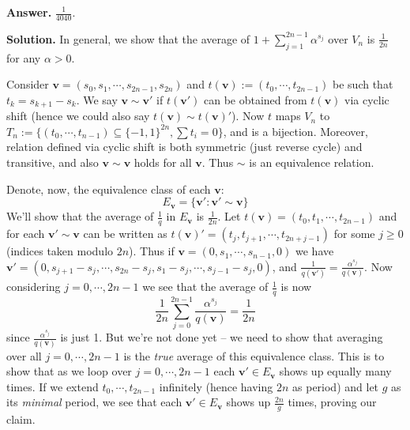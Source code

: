 \documentclass[11pt,a4paper]{article}
\newcommand{\<}{\langle}
\renewcommand{\>}{\rangle}
\begin{document}
\begin{enumerate}
	\textbf{Answer.} $\frac{1}{4040}$. 
	
	\textbf{Solution.} In general, we show that the average of $1+\sum_{j=1}^{2n-1}\alpha^{s_j}$ over $V_n$ is $\frac{1}{2n}$ for any $\alpha > 0$. 
	
	Consider $\mathbf{v}=(s_0,s_1,\cdots,s_{2n-1},s_{2n})$ and 
	$t(\mathbf{v}) := (t_0, \cdots, t_{2n-1})$ be such that $t_k = s_{k+1}-s_k$. 
	We say $\mathbf{v}\sim\mathbf{v'}$ if $t(\mathbf{v}')$ can be obtained from $t(\mathbf{v})$ via cyclic shift (hence we could also say $t(\mathbf{v})\sim t(\mathbf{v})'$). 
	Now $t$ maps $V_n$ to $T_n:=\{(t_0, \cdots, t_{n-1})\subseteq \{-1, 1\}^{2n}, \sum t_i=0\}$, 
	and is a bijection. 
	Moreover, relation defined via cyclic shift is both symmetric (just reverse cycle) and transitive, and also $\mathbf{v}\sim\mathbf{v}$ holds for all $\mathbf{v}$. 
	Thus $\sim$ is an equivalence relation. 
	
	Denote, now, the equivalence class of each $\mathbf{v}$: 
	\[
	E_{\mathbf{v}} = \{\mathbf{v}': \mathbf{v'}\sim \mathbf{v}\}
	\]
	We'll show that the average of $\frac{1}{q}$ in $E_{\mathbf{v}}$ is $\frac{1}{2n}$. 
	Let $t(\mathbf{v})=(t_0,t_1,\cdots,t_{2n-1})$ and for each $\mathbf{v}'\sim\mathbf{v}$ can be written as 
	$t(\mathbf{v})'=(t_j,t_{j+1},\cdots,t_{2n+j-1})$ for some $j\ge 0$ (indices taken modulo $2n$). 
	Thus if $\mathbf{v}=(0, s_1, \cdots, s_{n-1}, 0)$ we have 
	$\mathbf{v}'=(0, s_{j+1}-s_j, \cdots, s_{2n}-s_j, s_1-s_j, \cdots, s_{j-1}-s_j, 0)$, 
	and $\frac{1}{q(\mathbf{v}')}=\frac{\alpha^{s_j}}{q(\mathbf{v})}$. 
	Now considering $j=0, \cdots, 2n-1$ we see that the average of $\frac{1}{q}$ is now 
	\[
	\frac{1}{2n}\sum_{j=0}^{2n-1}\frac{\alpha^{s_j}}{q(\mathbf{v})} = \frac{1}{2n}
	\]
	since $\frac{\alpha^{s_j}}{q(\mathbf{v})}$ is just 1. 
	But we're not done yet -- we need to show that averaging over all $j=0, \cdots, 2n-1$ is the \emph{true} average of this equivalence class. 
	This is to show that as we loop over $j=0, \cdots, 2n-1$ each $\mathbf{v}'\in E_{\mathbf{v}}$ shows up equally many times. 
	If we extend $t_0, \cdots, t_{2n-1}$ infinitely (hence having $2n$ as period) and let $g$ as its \emph{minimal} period, we see that each $\mathbf{v}'\in E_{\mathbf{v}}$ shows up $\frac{2n}{g}$ times, 
	proving our claim. 
	
\end{enumerate}
\end{document}
